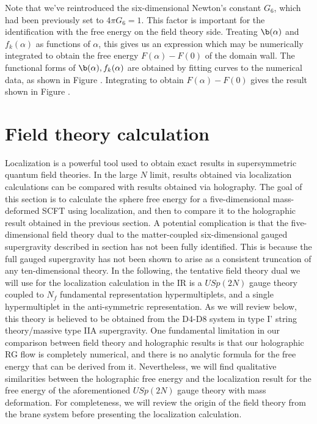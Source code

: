\documentclass[12pt]{article}
\begin{document}
Note that we've reintroduced the six-dimensional Newton's constant $G_6$, which had been previously set to $4 \pi G_{6} = 1$. This factor is important for the identification with the free energy on the field theory side.
Treating $\b(\alpha)$ and $f_k(\alpha)$ as functions of $\alpha$, this gives us an expression which may be numerically integrated to obtain the free energy $F(\alpha)-F(0)$ of the domain wall. The functional forms of $\b(\alpha),f_k(\alpha)$ are obtained by fitting curves to the numerical data, as shown in Figure . Integrating to obtain $F(\alpha) - F(0)$ gives the result shown in Figure .
\section{Field theory calculation}
\setcounter{equation}{0}
Localization  is a powerful tool used to obtain exact results in supersymmetric quantum field theories. In the large $N$ limit, results obtained via localization calculations  can be compared with  results obtained via holography. The goal of this section is to calculate the sphere free energy for a five-dimensional mass-deformed SCFT using localization, and then to compare it to the holographic result obtained in the previous section.
A potential complication is  that the five-dimensional field theory dual to the matter-coupled six-dimensional gauged supergravity described in section  has not been fully identified. This is because the full gauged supergravity has not been shown to arise as a consistent truncation of any ten-dimensional theory. In the following, the tentative field theory dual we will use for the localization calculation in the IR is a $USp(2N)$ gauge theory coupled to $N_f$ fundamental representation hypermultiplets, and a single hypermultiplet in the anti-symmetric representation. As we will review below, this theory is believed to be obtained from the D4-D8 system  in type I' string theory/massive type IIA supergravity.
One fundamental limitation in our comparison between field theory and holographic results is that our holographic RG flow is completely numerical, and there is no analytic formula for the free energy that can be derived from it. Nevertheless, we will find qualitative similarities between the holographic free energy and the localization result for the free energy of the aforementioned $USp(2N)$ gauge theory with mass deformation. For completeness, we will review the origin of the field theory from the brane system before presenting the localization calculation.
\end{document}
